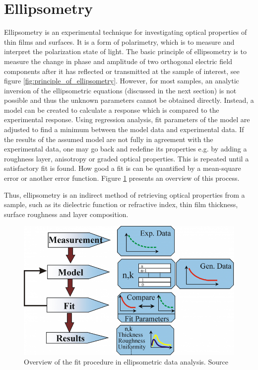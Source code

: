 \section{Ellipsometry}
Ellipsometry is an experimental technique for investigating optical properties of thin films and surfaces. It is a form of polarimetry, which is to measure and interpret the polarization state of light. The basic principle of ellipsometry is to measure the change in phase and amplitude of two orthogonal electric field components after it has reflected or transmitted at the sample of interest, see figure \ref{fig:principle_of_ellipsometry}. However, for most samples, an analytic inversion of the ellipsometric equations (discussed in the next section) is not possible and thus the unknown parameters cannot be obtained directly. Instead, a model can be created to calculate a response which is compared to the experimental response. Using regression analysis, fit parameters of the model are adjusted to find a minimum between the model data and experimental data. If the results of the assumed model are not fully in agreement with the experimental data, one may go back and redefine its properties e.g. by adding a roughness layer, anisotropy or graded optical properties. This is repeated until a satisfactory fit is found. How good a fit is can be quantified by a mean-square error or another error function. Figure \ref{fig:ellipsometryOverview} presents an overview of this process\cite{JAWoolam_DataAnalysis}.

Thus, ellipsometry is an indirect method of retrieving optical properties from a sample, such as its dielectric function or refractive index, thin film thickness, surface roughness and layer composition.
\begin{figure}
    \centering
    \includegraphics[scale=0.35]{figures/Ch2/EllipsometryOverview.png}
    \caption{Overview of the fit procedure in ellipsometric data analysis. Source \cite{JAWoolam_DataAnalysis}}
    \label{fig:ellipsometryOverview}
\end{figure}

